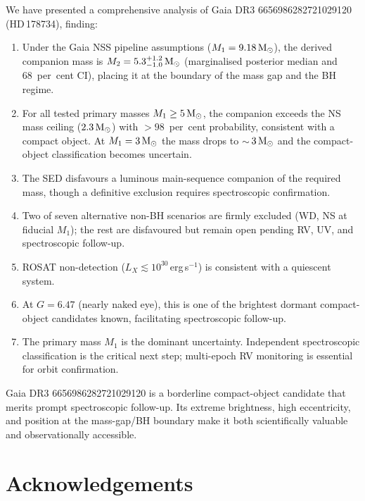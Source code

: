 \documentclass[usenatbib,fleqn]{mnras}
\newcommand{\Msun}{{\rm M}_\odot}
\begin{document}
We have presented a comprehensive analysis of Gaia DR3
6656986282721029120 (HD\,178734), finding:

\begin{enumerate}
\item Under the Gaia NSS pipeline assumptions
  ($M_1 = 9.18\,\Msun$), the derived companion mass is
  $M_2 = 5.3^{+1.2}_{-1.0}\,\Msun$ (marginalised posterior
  median and 68~per~cent CI), placing it at the
  boundary of the mass gap and the BH regime.

\item For all tested primary masses $M_1 \geq 5\,\Msun$, the
  companion exceeds the NS mass ceiling ($2.3\,\Msun$) with
  $>98$~per~cent probability, consistent with a compact
  object.  At $M_1 = 3\,\Msun$ the mass drops to
  $\sim$\,$3\,\Msun$ and the compact-object classification
  becomes uncertain.

\item The SED disfavours a luminous main-sequence companion of the
  required mass, though a definitive exclusion requires
  spectroscopic confirmation.

\item Two of seven alternative non-BH scenarios are firmly excluded
  (WD, NS at fiducial $M_1$); the rest are disfavoured but
  remain open pending RV, UV, and spectroscopic follow-up.

\item ROSAT non-detection ($L_X \lesssim 10^{30}$\,erg\,s$^{-1}$)
  is consistent with a quiescent system.

\item At $G = 6.47$ (nearly naked eye), this is one of the
  brightest dormant compact-object candidates known, facilitating
  spectroscopic follow-up.

\item The primary mass $M_1$ is the dominant uncertainty.
  Independent spectroscopic classification is the critical next
  step; multi-epoch RV monitoring is essential for orbit
  confirmation.
\end{enumerate}

Gaia DR3 6656986282721029120 is a borderline compact-object
candidate that merits prompt spectroscopic follow-up.  Its extreme
brightness, high eccentricity, and position at the mass-gap/BH
boundary make it both scientifically valuable and observationally
accessible.

\section*{Acknowledgements}
\end{document}
